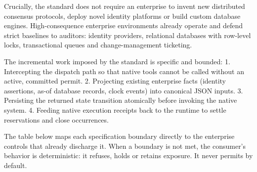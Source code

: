 \documentclass[
  american,
  11pt,
  letterpaper,
]{article}
\begin{document}
Crucially, the standard does not require an enterprise to invent new
distributed consensus protocols, deploy novel identity platforms or
build custom database engines. High-consequence enterprise environments
already operate and defend strict baselines to auditors: identity
providers, relational databases with row-level locks, transactional
queues and change-management ticketing.

The incremental work imposed by the standard is specific and bounded: 1.
Intercepting the dispatch path so that native tools cannot be called
without an active, committed permit. 2. Projecting existing enterprise
facts (identity assertions, as-of database records, clock events) into
canonical JSON inputs. 3. Persisting the returned state transition
atomically before invoking the native system. 4. Feeding native
execution receipts back to the runtime to settle reservations and close
occurrences.

The table below maps each specification boundary directly to the
enterprise controls that already discharge it. When a boundary is not
met, the consumer's behavior is deterministic: it refuses, holds or
retains exposure. It never permits by default.
\end{document}
